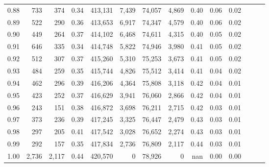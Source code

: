 \begin{tabular}{rrrrrrrrrrrrrr}
0.88 &     733 &    374 &  0.34 &  413,131 &    7,439 &  74,057 &   4,869 &  0.40 &  0.06 &      0.02 \\
0.89 &     522 &    290 &  0.36 &  413,653 &    6,917 &  74,347 &   4,579 &  0.40 &  0.06 &      0.02 \\
0.90 &     449 &    264 &  0.37 &  414,102 &    6,468 &  74,611 &   4,315 &  0.40 &  0.05 &      0.02 \\
0.91 &     646 &    335 &  0.34 &  414,748 &    5,822 &  74,946 &   3,980 &  0.41 &  0.05 &      0.02 \\
0.92 &     512 &    307 &  0.37 &  415,260 &    5,310 &  75,253 &   3,673 &  0.41 &  0.05 &      0.02 \\
0.93 &     484 &    259 &  0.35 &  415,744 &    4,826 &  75,512 &   3,414 &  0.41 &  0.04 &      0.02 \\
0.94 &     462 &    296 &  0.39 &  416,206 &    4,364 &  75,808 &   3,118 &  0.42 &  0.04 &      0.01 \\
0.95 &     423 &    252 &  0.37 &  416,629 &    3,941 &  76,060 &   2,866 &  0.42 &  0.04 &      0.01 \\
0.96 &     243 &    151 &  0.38 &  416,872 &    3,698 &  76,211 &   2,715 &  0.42 &  0.03 &      0.01 \\
0.97 &     373 &    236 &  0.39 &  417,245 &    3,325 &  76,447 &   2,479 &  0.43 &  0.03 &      0.01 \\
0.98 &     297 &    205 &  0.41 &  417,542 &    3,028 &  76,652 &   2,274 &  0.43 &  0.03 &      0.01 \\
0.99 &     292 &    157 &  0.35 &  417,834 &    2,736 &  76,809 &   2,117 &  0.44 &  0.03 &      0.01 \\
1.00 &   2,736 &  2,117 &  0.44 &  420,570 &        0 &  78,926 &       0 &   nan &  0.00 &      0.00 \\
\bottomrule
\end{tabular}
